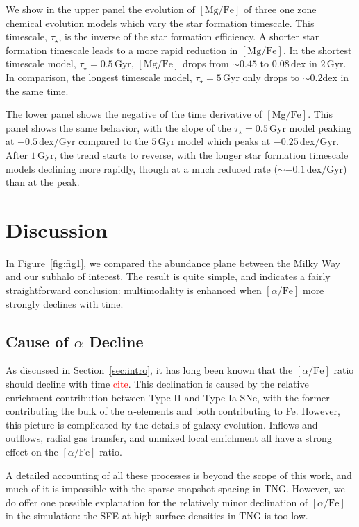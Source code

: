 \documentclass[linenumbers, twocolumn]{aastex631}
\newcommand{\Gyr}{\ensuremath{\textrm{Gyr}}}
\newcommand{\MgFe}{\ensuremath{[\textrm{Mg}/\textrm{Fe}]}}
\newcommand{\alphaFe}{\ensuremath{[\alpha/\textrm{Fe}]}}
\newcommand{\dex}{\ensuremath{\textrm{dex}}}
\newcommand{\red}[1]{\textcolor{red}{#1}}
\begin{document}
We show in the upper panel the evolution of \MgFe{} of three one zone chemical evolution models which vary the star formation timescale. This timescale, $\tau_{\star}$, is the inverse of the star formation efficiency. A shorter star formation timescale leads to a more rapid reduction in \MgFe{}. In the shortest timescale model, $\tau_{\star}=0.5\,\Gyr$, \MgFe{} drops from $\sim0.45$ to $0.08\,\dex$ in $2\,\Gyr$. In comparison, the longest timescale model, $\tau_{\star}=5\,\Gyr$ only drops to $\sim0.2\dex$ in the same time.

The lower panel shows the negative of the time derivative of \MgFe{}. This panel shows the same behavior, with the slope of the $\tau_{\star}=0.5\,\Gyr$ model peaking at $-0.5\,\dex/\Gyr$ compared to the $5\,\Gyr$ model which peaks at $-0.25\,\dex/\Gyr$. After $1\,\Gyr$, the trend starts to reverse, with the longer star formation timescale models declining more rapidly, though at a much reduced rate ($\sim-0.1\,\dex/\Gyr$) than at the peak.

\section{Discussion}\label{sec:disc}
In Figure~\ref{fig:fig1}, we compared the abundance plane between the Milky Way and our subhalo of interest. The result is quite simple, and indicates a fairly straightforward conclusion: multimodality is enhanced when \alphaFe{} more strongly declines with time. 

\subsection{Cause of $\alpha$ Decline}\label{ssec:sfe}
As discussed in Section~\ref{sec:intro}, it has long been known that the \alphaFe{} ratio should decline with time \red{cite}. This declination is caused by the relative enrichment contribution between Type II and Type Ia SNe, with the former contributing the bulk of the $\alpha$-elements and both contributing to Fe. However, this picture is complicated by the details of galaxy evolution. Inflows and outflows, radial gas transfer, and unmixed local enrichment all have a strong effect on the \alphaFe{} ratio.

A detailed accounting of all these processes is beyond the scope of this work, and much of it is impossible with the sparse snapshot spacing in TNG. However, we do offer one possible explanation for the relatively minor declination of \alphaFe{} in the simulation: the SFE at high surface densities in TNG is too low.
\end{document}

